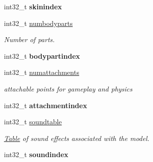 \begin{DoxyCompactItemize}
\item 
\hypertarget{struct_assimp_1_1_m_d_l_1_1_header___h_l2_a19156d7539fa19d4518edb85c183270c}{int32\+\_\+t {\bfseries skinindex}}\label{struct_assimp_1_1_m_d_l_1_1_header___h_l2_a19156d7539fa19d4518edb85c183270c}

\item 
\hypertarget{struct_assimp_1_1_m_d_l_1_1_header___h_l2_ae10b8eeaa0683758087fce61629f43e0}{int32\+\_\+t \hyperlink{struct_assimp_1_1_m_d_l_1_1_header___h_l2_ae10b8eeaa0683758087fce61629f43e0}{numbodyparts}}\label{struct_assimp_1_1_m_d_l_1_1_header___h_l2_ae10b8eeaa0683758087fce61629f43e0}

\begin{DoxyCompactList}\small\item\em Number of parts. \end{DoxyCompactList}\item 
\hypertarget{struct_assimp_1_1_m_d_l_1_1_header___h_l2_a452c6586e7b5bba7c8e6ba8c4bcd319a}{int32\+\_\+t {\bfseries bodypartindex}}\label{struct_assimp_1_1_m_d_l_1_1_header___h_l2_a452c6586e7b5bba7c8e6ba8c4bcd319a}

\item 
\hypertarget{struct_assimp_1_1_m_d_l_1_1_header___h_l2_ad445772c29e7b81e823ba308a5bd2487}{int32\+\_\+t \hyperlink{struct_assimp_1_1_m_d_l_1_1_header___h_l2_ad445772c29e7b81e823ba308a5bd2487}{numattachments}}\label{struct_assimp_1_1_m_d_l_1_1_header___h_l2_ad445772c29e7b81e823ba308a5bd2487}

\begin{DoxyCompactList}\small\item\em attachable points for gameplay and physics \end{DoxyCompactList}\item 
\hypertarget{struct_assimp_1_1_m_d_l_1_1_header___h_l2_a29fdb9ec1fe4b170cf19a515fbf8de01}{int32\+\_\+t {\bfseries attachmentindex}}\label{struct_assimp_1_1_m_d_l_1_1_header___h_l2_a29fdb9ec1fe4b170cf19a515fbf8de01}

\item 
\hypertarget{struct_assimp_1_1_m_d_l_1_1_header___h_l2_ad372d4067f84ccde0ca14158cfa2fa13}{int32\+\_\+t \hyperlink{struct_assimp_1_1_m_d_l_1_1_header___h_l2_ad372d4067f84ccde0ca14158cfa2fa13}{soundtable}}\label{struct_assimp_1_1_m_d_l_1_1_header___h_l2_ad372d4067f84ccde0ca14158cfa2fa13}

\begin{DoxyCompactList}\small\item\em \hyperlink{struct_table}{Table} of sound effects associated with the model. \end{DoxyCompactList}\item 
\hypertarget{struct_assimp_1_1_m_d_l_1_1_header___h_l2_a146170334de7a0748352e70e22bf7b6c}{int32\+\_\+t {\bfseries soundindex}}\label{struct_assimp_1_1_m_d_l_1_1_header___h_l2_a146170334de7a0748352e70e22bf7b6c}


\end{DoxyCompactItemize}

